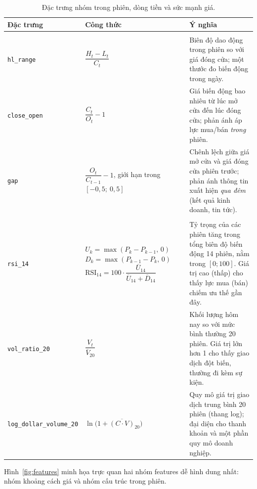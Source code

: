 \documentclass[a4paper,12pt]{article}
\begin{document}
\begin{table}[H]\centering\small
\caption{Đặc trưng nhóm trong phiên, dòng tiền và sức mạnh giá.}
\label{tab:feat3}
\renewcommand{\arraystretch}{1.45}
\begin{tabularx}{\textwidth}{@{}>{\raggedright\arraybackslash}p{2.5cm}>{\raggedright\arraybackslash}p{5.4cm}X@{}}
\toprule
\textbf{Đặc trưng} & \textbf{Công thức} & \textbf{Ý nghĩa}\\\midrule
\multicolumn{3}{@{}l}{\textit{Nhóm 5 -- Cấu trúc trong phiên (3 features)}}\\
\texttt{hl\_range} & $\dfrac{H_t-L_t}{C_t}$ & Biên độ dao động trong phiên so với giá đóng cửa; một thước đo biến động trong ngày.\\
\texttt{close\_open} & $\dfrac{C_t}{O_t}-1$ & Giá biến động bao nhiêu từ lúc mở cửa đến lúc đóng cửa; phản ánh áp lực mua/bán \emph{trong} phiên.\\
\texttt{gap} & $\dfrac{O_t}{C_{t-1}}-1$, giới hạn trong $[-0{,}5;\ 0{,}5]$ & Chênh lệch giữa giá mở cửa và giá đóng cửa phiên trước; phản ánh thông tin xuất hiện \emph{qua đêm} (kết quả kinh doanh, tin tức).\\
\multicolumn{3}{@{}l}{\textit{Nhóm 6 -- Dòng tiền và sức mạnh giá (3 features)}}\\
\texttt{rsi\_14} & $U_k=\max(P_k-P_{k-1},\,0)$\newline $D_k=\max(P_{k-1}-P_k,\,0)$\newline $\mathrm{RSI}_{14}=100\cdot\dfrac{\overline{U}_{14}}{\overline{U}_{14}+\overline{D}_{14}}$ & Tỷ trọng của các phiên tăng trong tổng biên độ biến động 14 phiên, nằm trong $[0;100]$. Giá trị cao (thấp) cho thấy lực mua (bán) chiếm ưu thế gần đây.\\
\texttt{vol\_ratio\_20} & $\dfrac{V_t}{\overline{V}_{20}}$ & Khối lượng hôm nay so với mức bình thường 20 phiên. Giá trị lớn hơn 1 cho thấy giao dịch đột biến, thường đi kèm sự kiện.\\
\texttt{log\_dollar\_}\newline\texttt{volume\_20} & $\ln\!\big(1+\overline{(C\cdot V)}_{20}\big)$ & Quy mô giá trị giao dịch trung bình 20 phiên (thang log); đại diện cho thanh khoản và một phần quy mô doanh nghiệp.\\
\bottomrule
\end{tabularx}
\end{table}

Hình~\ref{fig:features} minh họa trực quan hai nhóm features dễ hình dung nhất: nhóm khoảng cách giá và nhóm cấu trúc trong phiên.
\end{document}
